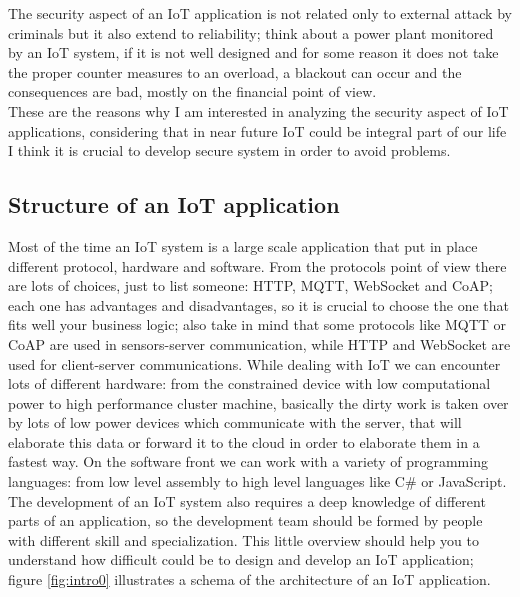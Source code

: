 	The security aspect of an IoT application is not related only to external attack by criminals but it also extend to reliability; think about a power plant monitored by
	an IoT system, if it is not well designed and for some reason it does not take the proper counter measures to an overload, a blackout can occur and the consequences are bad, mostly on the financial point of view.\\
	These are the reasons why I am interested in analyzing the security aspect of IoT applications, considering that in near future
	IoT could be integral part of our life I think it is crucial to develop secure system in order to avoid problems.
	
	
	\subsection{Structure of an IoT application}
	Most of the time an IoT system is a large scale application that put in place different protocol, hardware and software.\newline
	From the protocols point of view there are lots of choices, just to list someone: HTTP, MQTT, WebSocket and CoAP;
	each one has advantages and disadvantages, so it is crucial to choose the one that fits well your business logic; also take in mind
	that some protocols like MQTT or CoAP are used in sensors-server communication, while HTTP and WebSocket
	are used for client-server communications.\newline
	While dealing with IoT we can encounter lots of different hardware: from the constrained device with low computational power to
	high performance cluster machine, basically the dirty work is taken over by lots of low power devices which communicate with the server,
	that will elaborate this data or forward it to the cloud in order to elaborate them in a fastest way.\newline
	On the software front we can work with a variety of programming languages: from low level assembly to high level languages like C\# or JavaScript.\newline
	The development of an IoT system also requires a deep knowledge of different parts of an application, so the development team
	should be formed by people with different skill and specialization.\newline
	This little overview should help you to understand how difficult could be to design and develop an IoT application; figure \ref{fig:intro0} illustrates a schema of the architecture of an IoT application.\newline
	
